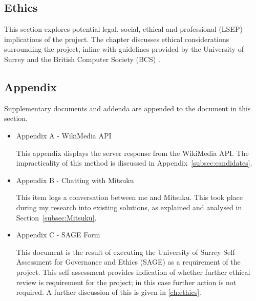 \subsection*{Ethics}
This section explores potential legal, social, ethical and professional (LSEP) implications of the project. The chapter discusses ethical considerations surrounding the project, inline with guidelines provided by the University of Surrey \cite{surreyethics} and the British Computer Society (BCS) \cite{bcs2019conduct}.

\subsection*{Appendix}
Supplementary documents and addenda are appended to the document in this section.
\begin{itemize}
	\item Appendix A - WikiMedia API
	\par This appendix displays the server response from the WikiMedia API. The impracticality of this method is discussed in Appendix~\ref{subsec:candidates}.
	
	\item Appendix B - Chatting with Mitsuku
	\par This item logs a conversation between me and Mitsuku. This took place during my research into existing solutions, as explained and analysed in Section~\ref{subsec:Mitsuku}.
	
	\item Appendix C - SAGE Form
	\par This document is the result of executing the University of Surrey Self-Assessment for Governance and Ethics (SAGE) as a requirement of the project. This self-assessment provides indication of whether further ethical review is requirement for the project; in this case further action is not required. A further discussion of this is given in \ref{ch:ethics}.
\end{itemize}
